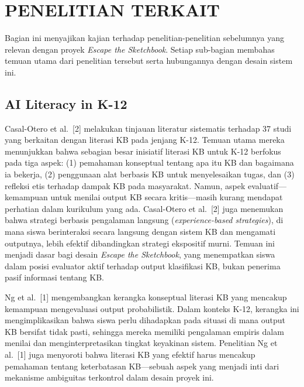 \documentclass[12pt,oneside]{report}
\begin{document}
\section{PENELITIAN TERKAIT}
\label{sec:penelitian-terkait}

Bagian ini menyajikan kajian terhadap penelitian-penelitian sebelumnya yang relevan dengan proyek \textit{Escape the Sketchbook}. Setiap sub-bagian membahas temuan utama dari penelitian tersebut serta hubungannya dengan desain sistem ini.

\subsection{AI Literacy in K-12}
\label{subsec:penelitian-ai-literacy-k12}

Casal-Otero et al.\ [2] melakukan tinjauan literatur sistematis terhadap 37 studi yang berkaitan dengan literasi KB pada jenjang K-12. Temuan utama mereka menunjukkan bahwa sebagian besar inisiatif literasi KB untuk K-12 berfokus pada tiga aspek: (1) pemahaman konseptual tentang apa itu KB dan bagaimana ia bekerja, (2) penggunaan alat berbasis KB untuk menyelesaikan tugas, dan (3) refleksi etis terhadap dampak KB pada masyarakat. Namun, aspek evaluatif---kemampuan untuk menilai output KB secara kritis---masih kurang mendapat perhatian dalam kurikulum yang ada. Casal-Otero et al.\ [2] juga menemukan bahwa strategi berbasis pengalaman langsung (\textit{experience-based strategies}), di mana siswa berinteraksi secara langsung dengan sistem KB dan mengamati outputnya, lebih efektif dibandingkan strategi ekspositif murni. Temuan ini menjadi dasar bagi desain \textit{Escape the Sketchbook}, yang menempatkan siswa dalam posisi evaluator aktif terhadap output klasifikasi KB, bukan penerima pasif informasi tentang KB.

Ng et al.\ [1] mengembangkan kerangka konseptual literasi KB yang mencakup kemampuan mengevaluasi output probabilistik. Dalam konteks K-12, kerangka ini mengimplikasikan bahwa siswa perlu dihadapkan pada situasi di mana output KB bersifat tidak pasti, sehingga mereka memiliki pengalaman empiris dalam menilai dan menginterpretasikan tingkat keyakinan sistem. Penelitian Ng et al.\ [1] juga menyoroti bahwa literasi KB yang efektif harus mencakup pemahaman tentang keterbatasan KB---sebuah aspek yang menjadi inti dari mekanisme ambiguitas terkontrol dalam desain proyek ini.
\end{document}
